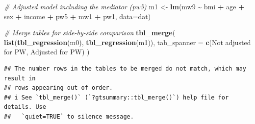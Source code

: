\documentclass[
]{book}
\newenvironment{Shaded}{\begin{snugshade}}{\end{snugshade}}
\newcommand{\AttributeTok}[1]{\textcolor[rgb]{0.13,0.29,0.53}{#1}}
\newcommand{\CommentTok}[1]{\textcolor[rgb]{0.56,0.35,0.01}{\textit{#1}}}
\newcommand{\FunctionTok}[1]{\textcolor[rgb]{0.13,0.29,0.53}{\textbf{#1}}}
\newcommand{\NormalTok}[1]{#1}
\newcommand{\OtherTok}[1]{\textcolor[rgb]{0.56,0.35,0.01}{#1}}
\newcommand{\SpecialCharTok}[1]{\textcolor[rgb]{0.81,0.36,0.00}{\textbf{#1}}}
\newcommand{\StringTok}[1]{\textcolor[rgb]{0.31,0.60,0.02}{#1}}
\begin{document}
\begin{Shaded}
\begin{Highlighting}[]
\CommentTok{\# Adjusted model including the mediator (pw5)}
\NormalTok{m1 }\OtherTok{\textless{}{-}} \FunctionTok{lm}\NormalTok{(mw9 }\SpecialCharTok{\textasciitilde{}}\NormalTok{ bmi }\SpecialCharTok{+}\NormalTok{ age }\SpecialCharTok{+}\NormalTok{ sex }\SpecialCharTok{+}\NormalTok{ income }\SpecialCharTok{+}\NormalTok{ pw5 }\SpecialCharTok{+}\NormalTok{ mw1 }\SpecialCharTok{+}\NormalTok{ pw1, }\AttributeTok{data=}\NormalTok{dat)}

\CommentTok{\# Merge tables for side{-}by{-}side comparison}
\FunctionTok{tbl\_merge}\NormalTok{(}
  \FunctionTok{list}\NormalTok{(}\FunctionTok{tbl\_regression}\NormalTok{(m0), }\FunctionTok{tbl\_regression}\NormalTok{(m1)), }
  \AttributeTok{tab\_spanner =} \FunctionTok{c}\NormalTok{(}\StringTok{\textquotesingle{}Not adjusted for PW\textquotesingle{}}\NormalTok{, }\StringTok{\textquotesingle{}Adjusted for PW\textquotesingle{}}\NormalTok{)}
\NormalTok{)}
\end{Highlighting}
\end{Shaded}

\begin{verbatim}
## The number rows in the tables to be merged do not match, which may result in
## rows appearing out of order.
## i See `tbl_merge()` (`?gtsummary::tbl_merge()`) help file for details. Use
##   `quiet=TRUE` to silence message.
\end{verbatim}
\end{document}
